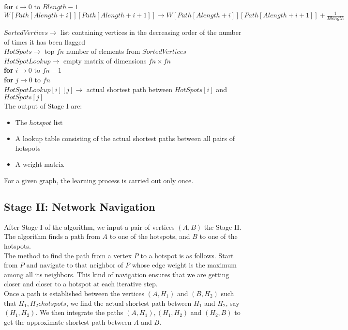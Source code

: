 \documentclass{article}
\begin{document}
			\textbf{for} $i \to 0$ to $Blength-1$\\
				$W[Path[Alength+i]][Path[Alength + i + 1]] \to W[Path[Alength+i]][Path[Alength + i + 1]] + \frac{1}{Blength}$
			
	$SortedVertices \to$ list containing vertices in the decreasing order of the number of times it has been flagged\\
	
	$HotSpots \to$ top $fn$ number of elements from $SortedVertices$\\

	$HotSpotLookup \to$ empty matrix of dimensions $fn \times fn$\\ 
	\textbf{for} $i\to0$ to $fn-1$\\
		\textbf{for} $j\to0$ to $fn$\\
			$HotSpotLookup[i][j]\to$ actual shortest path between $HotSpots[i]$ and $HotSpots[j]$\\
			
The output of Stage I are:\\
\begin{itemize}
\item The $hotspot$ list
\item A lookup table consisting of the actual shortest paths between all pairs of hotspots
\item A weight matrix
\end{itemize}

For a given graph, the learning process is carried out only once.

\subsection{Stage II: Network Navigation}
After Stage I of the algorithm, we input a pair of vertices $(A,B)$ the Stage II. The algorithm finds a path from $A$ to one of the hotspots, and $B$ to one of the hotspots.\\
The method to find the path from a vertex $P$ to a hotspot is as follows. Start from $P$ and navigate to that neighbor of $P$ whose edge weight is the maximum among all its neighbors. This kind of navigation ensures that we are getting closer and closer to a hotspot at each iterative step.\\
Once a path is established between the vertices $(A,H_1)$ and $(B,H_2)$ such that $H_1,H_2 \epsilon hotspots$, we find the actual shortest path between $H_1$ and $H_2$, say $(H_1, H_2)$. We then integrate the paths $(A,H_1), (H_1, H_2)$ and $(H_2,B)$ to get the approximate shortest path between $A$ and $B$.\\
\end{document}
